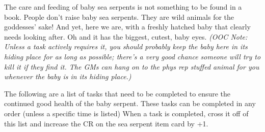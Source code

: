 \documentclass[green]{GL2020}
\begin{document}
\name{\gSeaSerpent{}}

The care and feeding of baby sea serpents is not something to be found in a book. People don’t raise baby sea serpents. They are wild animals for the goddesses’ sake! And yet, here we are, with a freshly hatched baby that clearly needs looking after. Oh and it has the biggest, cutest, baby eyes. \emph{(OOC Note: Unless a task actively requires it, you should probably keep the baby here in its hiding place for as long as possible; there’s a very good chance someone will try to kill it if they find it. The GMs can hang on to the phys rep stuffed animal for you whenever the baby is in its hiding place.)}

The following are a list of tasks that need to be completed to ensure the continued good health of the baby serpent. These tasks can be completed in any order (unless a specific time is listed) When a task is completed, cross it off of this list and increase the CR on the sea serpent item card by +1.
\end{document}
